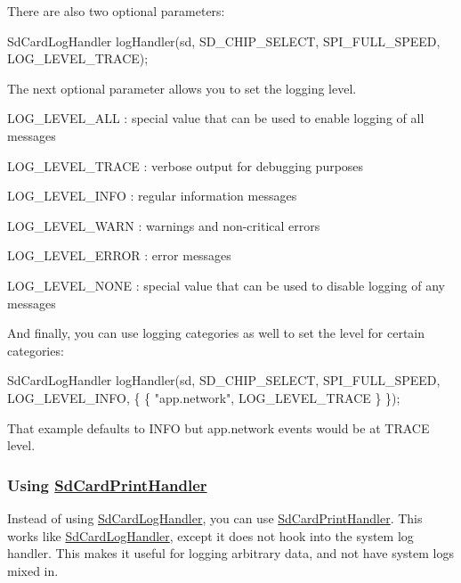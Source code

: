 There are also two optional parameters\+:


\begin{DoxyCode}
SdCardLogHandler logHandler(sd, SD\_CHIP\_SELECT, SPI\_FULL\_SPEED, LOG\_LEVEL\_TRACE);
\end{DoxyCode}


The next optional parameter allows you to set the logging level.


\begin{DoxyItemize}
\item {\ttfamily L\+O\+G\+\_\+\+L\+E\+V\+E\+L\+\_\+\+A\+LL} \+: special value that can be used to enable logging of all messages
\item {\ttfamily L\+O\+G\+\_\+\+L\+E\+V\+E\+L\+\_\+\+T\+R\+A\+CE} \+: verbose output for debugging purposes
\item {\ttfamily L\+O\+G\+\_\+\+L\+E\+V\+E\+L\+\_\+\+I\+N\+FO} \+: regular information messages
\item {\ttfamily L\+O\+G\+\_\+\+L\+E\+V\+E\+L\+\_\+\+W\+A\+RN} \+: warnings and non-\/critical errors
\item {\ttfamily L\+O\+G\+\_\+\+L\+E\+V\+E\+L\+\_\+\+E\+R\+R\+OR} \+: error messages
\item {\ttfamily L\+O\+G\+\_\+\+L\+E\+V\+E\+L\+\_\+\+N\+O\+NE} \+: special value that can be used to disable logging of any messages
\end{DoxyItemize}

And finally, you can use logging categories as well to set the level for certain categories\+:


\begin{DoxyCode}
SdCardLogHandler logHandler(sd, SD\_CHIP\_SELECT, SPI\_FULL\_SPEED, LOG\_LEVEL\_INFO, \{
    \{ "app.network", LOG\_LEVEL\_TRACE \} 
\});
\end{DoxyCode}


That example defaults to I\+N\+FO but app.\+network events would be at T\+R\+A\+CE level.

\subsubsection*{Using \mbox{\hyperlink{class_sd_card_print_handler}{Sd\+Card\+Print\+Handler}}}

Instead of using \mbox{\hyperlink{class_sd_card_log_handler}{Sd\+Card\+Log\+Handler}}, you can use \mbox{\hyperlink{class_sd_card_print_handler}{Sd\+Card\+Print\+Handler}}. This works like \mbox{\hyperlink{class_sd_card_log_handler}{Sd\+Card\+Log\+Handler}}, except it does not hook into the system log handler. This makes it useful for logging arbitrary data, and not have system logs mixed in.


